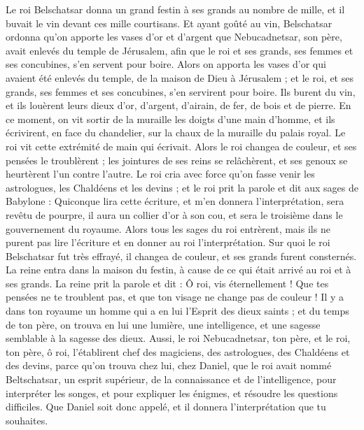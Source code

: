 \begin{multicols}{2}
\VerseOne{}Le roi Belschatsar donna un grand festin à ses grands au nombre de mille, et il buvait le vin devant ces mille courtisans.
Et ayant goûté au vin, Belschatsar ordonna qu’on apporte les vases d'or et d'argent que Nebucadnetsar, son père, avait enlevés du temple de Jérusalem, afin que le roi et ses grands, ses femmes et ses concubines, s’en servent pour boire.
Alors on apporta les vases d'or qui avaient été enlevés du temple, de la maison de Dieu à Jérusalem ; et le roi, et ses grands, ses femmes et ses concubines, s’en servirent pour boire.
Ils burent du vin, et ils louèrent leurs dieux d'or, d'argent, d'airain, de fer, de bois et de pierre.
En ce moment, on vit sortir de la muraille les doigts d'une main d'homme, et ils écrivirent, en face du chandelier, sur la chaux de la muraille du palais royal. Le roi vit cette extrémité de main qui écrivait.
Alors le roi changea de couleur, et ses pensées le troublèrent ; les jointures de ses reins se relâchèrent, et ses genoux se heurtèrent l'un contre l'autre.
Le roi cria avec force qu'on fasse venir les astrologues, les Chaldéens et les devins ; et le roi prit la parole et dit aux sages de Babylone : Quiconque lira cette écriture, et m’en donnera l’interprétation, sera revêtu de pourpre, il aura un collier d'or à son cou, et sera le troisième dans le gouvernement du royaume.
Alors tous les sages du roi entrèrent, mais ils ne purent pas lire l'écriture et en donner au roi l'interprétation.
Sur quoi le roi Belschatsar fut très effrayé, il changea de couleur, et ses grands furent consternés.
La reine entra dans la maison du festin, à cause de ce qui était arrivé au roi et à ses grands. La reine prit la parole et dit : Ô roi, vis éternellement ! Que tes pensées ne te troublent pas, et que ton visage ne change pas de couleur !
Il y a dans ton royaume un homme qui a en lui l'Esprit des dieux saints ; et du temps de ton père,  on trouva en lui une lumière, une intelligence, et une sagesse semblable à la sagesse des dieux. Aussi, le roi Nebucadnetsar, ton père, et le roi, ton père, ô roi, l’établirent chef des magiciens, des astrologues, des Chaldéens et des devins,
parce qu’on trouva chez lui, chez Daniel, que le roi avait nommé  Beltschatsar, un esprit supérieur, de la connaissance et de l’intelligence, pour interpréter les songes, et pour expliquer les énigmes, et résoudre les questions difficiles. Que Daniel soit donc appelé, et il donnera l'interprétation que tu souhaites.

\end{multicols}
